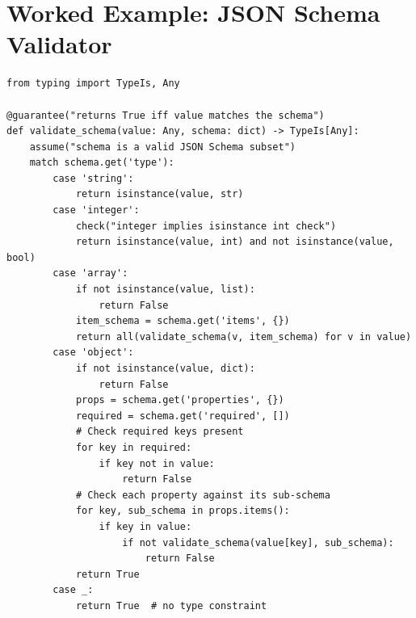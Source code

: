 \documentclass[11pt,a4paper]{report}
\theoremstyle{definition}
\theoremstyle{plain}
\begin{document}
\section{Worked Example: JSON Schema Validator}

\begin{lstlisting}[style=synhopy]
from typing import TypeIs, Any

@guarantee("returns True iff value matches the schema")
def validate_schema(value: Any, schema: dict) -> TypeIs[Any]:
    assume("schema is a valid JSON Schema subset")
    match schema.get('type'):
        case 'string':
            return isinstance(value, str)
        case 'integer':
            check("integer implies isinstance int check")
            return isinstance(value, int) and not isinstance(value, bool)
        case 'array':
            if not isinstance(value, list):
                return False
            item_schema = schema.get('items', {})
            return all(validate_schema(v, item_schema) for v in value)
        case 'object':
            if not isinstance(value, dict):
                return False
            props = schema.get('properties', {})
            required = schema.get('required', [])
            # Check required keys present
            for key in required:
                if key not in value:
                    return False
            # Check each property against its sub-schema
            for key, sub_schema in props.items():
                if key in value:
                    if not validate_schema(value[key], sub_schema):
                        return False
            return True
        case _:
            return True  # no type constraint
\end{lstlisting}
\end{document}
